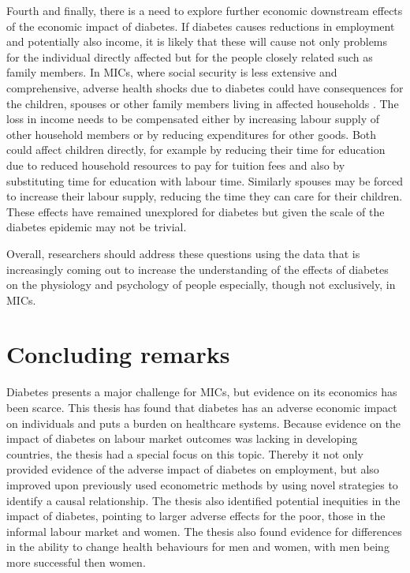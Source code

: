 Fourth and finally, there is a need to explore further economic downstream effects of the economic impact of diabetes. If diabetes causes reductions in employment and potentially also income, it is likely that these will cause not only problems for the individual directly affected but for the people closely related such as family members. In \acp{MIC}, where social security is less extensive and comprehensive, adverse health shocks due to diabetes could have consequences for the children, spouses or other family members living in affected households \parencite{Alam2014}. The loss in income needs to be compensated either by increasing labour supply of other household members or by reducing expenditures for other goods. Both could affect children directly, for example by reducing their time for education due to reduced household resources to pay for tuition fees and also by substituting time for education with labour time. Similarly spouses may be forced to increase their labour supply, reducing the time they can care for their children. These effects have remained unexplored for diabetes but given the scale of the diabetes epidemic may not be trivial.

Overall, researchers should address these questions using the data that is increasingly coming out to increase the understanding of the effects of diabetes on the physiology and psychology of people especially, though not exclusively, in \acp{MIC}.


\section{Concluding remarks}

Diabetes presents a major challenge for \acp{MIC}, but evidence on its economics has been scarce. This thesis has found that diabetes has an adverse economic impact on individuals and puts a burden on healthcare systems. Because evidence on the impact of diabetes on labour market outcomes was lacking in developing countries, the thesis had a special focus on this topic. Thereby it not only provided evidence of the adverse impact of diabetes on employment, but also improved upon previously used econometric methods by using novel strategies to identify a causal relationship. The thesis also identified potential inequities in the impact of diabetes, pointing to larger adverse effects for the poor, those in the informal labour market and women. The thesis also found evidence for differences in the ability to change health behaviours for men and women, with men being more successful then women. 


